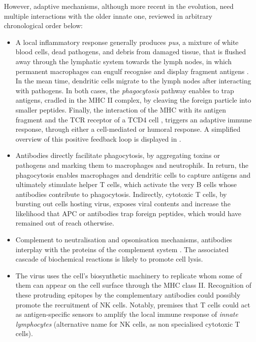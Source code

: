      However, adaptive mechanisms, although more recent in the evolution, need multiple interactions with the older innate one, reviewed in arbitrary chronological order below:
    \begin{itemize}
        \item A local inflammatory response generally produces \emph{pus}, a mixture of white blood cells, dead pathogens, and debris from damaged tissue, that is flushed away through the lymphatic system towards the lymph nodes, in which permanent macrophages can engulf recognise and display fragment antigens \autocite[Figure 12, Chapter 43]{campbell_etal20}. In the mean time, dendritic cells migrate to the lymph nodes after interacting with pathogens. 
        In both cases, the \emph{phagocytosis} pathway enables to trap antigens, cradled in the MHC II complex, by cleaving the foreign particle into smaller peptides. Finally, the interaction of the MHC with its antigen fragment and the TCR receptor of a TCD4 cell \autocite[Figures 12 and 13, Chapter 43]{campbell_etal20}, triggers an adaptive immune response, through either a cell-mediated or humoral response. A simplified overview of this positive feedback loop is displayed in \autocite[Figures 23, Chapter 43]{campbell_etal20}.
        \item Antibodies directly facilitate phagocytosis, by aggregating toxins or pathogens and marking them to macrophages and neutrophils. In return, the phagocytosis enables macrophages and dendritic cells to capture antigens and ultimately stimulate helper T cells, which activate the very B cells whose antibodies contribute to phagocytosis. Indirectly, cytotoxic T cells, by bursting out cells hosting virus, exposes viral contents and increase the likelihood that APC or antibodies trap foreign peptides, which would have remained out of reach otherwise. 
        \item Complement to neutralisation and opsonisation mechanisms, antibodies interplay with the proteins of the complement system \autocite[Figure 21, Chapter 43]{campbell_etal20}. The associated cascade of biochemical reactions is likely to promote cell lysis.  
        \item The virus uses the cell’s biosynthetic machinery to replicate whom some of them can appear on the cell surface through the MHC class II. Recognition of these protruding epitopes by the complementary antibodies could possibly promote the recruitment of NK cells. Notably, \autocite{gasteiger_rudensky14} premises that T cells could act as antigen-specific sensors to amplify the local immune response of \emph{innate lymphocytes} (alternative name for NK cells, as non specialised cytotoxic T cells).
    \end{itemize}



